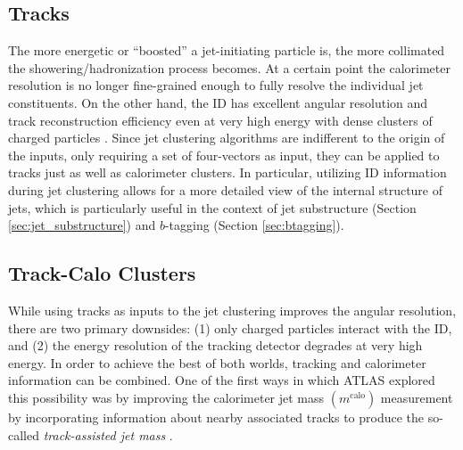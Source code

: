 \subsection{Tracks}
The more energetic or ``boosted'' a jet-initiating particle is, the more collimated the showering/hadronization process becomes.
At a certain point the calorimeter resolution is no longer fine-grained enough to fully resolve the individual jet constituents.
On the other hand, the ID has excellent angular resolution and track reconstruction efficiency even at very high energy with dense clusters of charged particles \cite{Aaboud:2017all}.
Since jet clustering algorithms are indifferent to the origin of the inputs, only requiring a set of four-vectors as input, they can be applied to tracks just as well as calorimeter clusters.
In particular, utilizing ID information during jet clustering allows for a more detailed view of the internal structure of jets, which is particularly useful in the context of jet substructure (Section \ref{sec:jet_substructure}) and $b$-tagging (Section \ref{sec:btagging}).

\subsection{Track-Calo Clusters}
\newcommand{\mCALO}{\ensuremath{m^{\mathrm{calo}}}}
\newcommand{\mTRACK}{\ensuremath{m^{\mathrm{track}}}}
\newcommand{\mTA}{\ensuremath{m^{\mathrm{TA}}}}
\newcommand{\ptCALO}{\ensuremath{p_T^{\mathrm{calo}}}}
\newcommand{\ptTRACK}{\ensuremath{p_T^{\mathrm{track}}}}
While using tracks as inputs to the jet clustering improves the angular resolution, there are two primary downsides: (1) only charged particles interact with the ID, and (2) the energy resolution of the tracking detector degrades at very high energy.
In order to achieve the best of both worlds, tracking and calorimeter information can be combined.
One of the first ways in which ATLAS explored this possibility was by improving the calorimeter jet mass $(\mCALO)$ measurement by incorporating information about nearby associated tracks to produce the so-called \textit{track-assisted jet mass} \cite{ATLAS-CONF-2016-035}.

